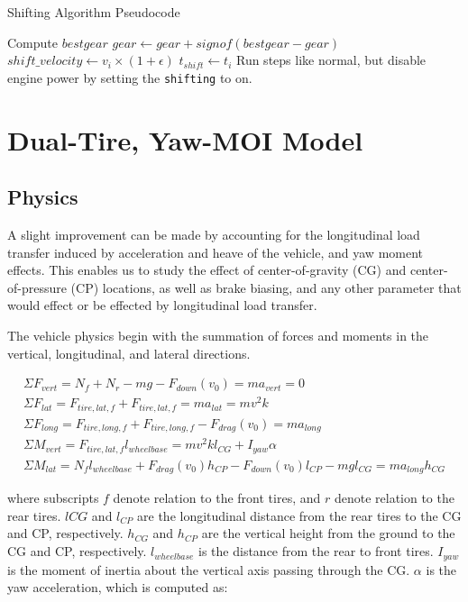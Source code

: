 \documentclass{article}
\begin{document}
\begin{algorithm}[H]
\caption{Shifting Algorithm Pseudocode}
\begin{algorithmic}[1]
	\State Compute $bestgear$
	\State $gear \gets gear + signof(bestgear - gear)$
	\State $shift\_velocity \gets v_i \times (1 + \epsilon)$
	\State $t_{shift} \gets t_i$
	\State Run steps like normal, but disable engine power by setting the \texttt{shifting} to on.
	\EndWhile
	\EndIf
\end{algorithmic}
\end{algorithm}

\section{Dual-Tire, Yaw-MOI Model}

\subsection{Physics}

A slight improvement can be made by accounting for the longitudinal load transfer induced by acceleration and heave of the vehicle, and yaw moment effects. This enables us to study the effect of center-of-gravity (CG) and center-of-pressure (CP) locations, as well as brake biasing, and any other parameter that would effect or be effected by longitudinal load transfer.

The vehicle physics begin with the summation of forces and moments in the vertical, longitudinal, and lateral directions.

\begin{align}
	\Sigma F_{vert} = N_{f} + N_{r} - m g - F_{down}(v_0) = m a_{vert} = 0 \\
	\Sigma F_{lat}  = F_{tire,lat,f} + F_{tire,lat,f} = m a_{lat} = m v^2 k \\
	\Sigma F_{long} = F_{tire,long,f} + F_{tire,long,f} - F_{drag}(v_0) = m a_{long} \\	
	\Sigma M_{vert} = F_{tire,lat,f} l_{wheelbase} = m v^2 k l_{CG} + I_{yaw} \alpha \\
	\Sigma M_{lat}  = N_{f} l_{wheelbase} + F_{drag}(v_0) h_{CP} - F_{down}(v_0) l_{CP} - m g l_{CG} = m a_{long} h_{CG}
\end{align}

where subscripts $f$ denote relation to the front tires, and $r$ denote relation to the rear tires. $l{CG}$ and $l_{CP}$ are the longitudinal distance from the rear tires to the CG and CP, respectively. $h_{CG}$ and $h_{CP}$ are the vertical height from the ground to the CG and CP, respectively. $l_{wheelbase}$ is the distance from the rear to front tires. $I_{yaw}$ is the moment of inertia about the vertical axis passing through the CG. $\alpha$ is the yaw acceleration, which is computed as:
\end{document}
